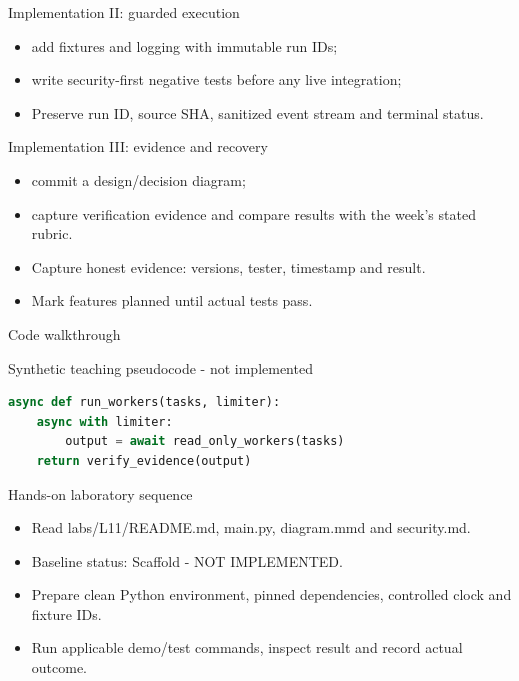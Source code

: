 \documentclass[aspectratio=169,10pt]{beamer}
\begin{document}
\begin{frame}{Implementation II: guarded execution}
\small
\begin{itemize}
\item add fixtures and logging with immutable run IDs;
\item write security-first negative tests before any live integration;
\item Preserve run ID, source SHA, sanitized event stream and terminal status.
\end{itemize}

\end{frame}

\begin{frame}{Implementation III: evidence and recovery}
\small
\begin{itemize}
\item commit a design/decision diagram;
\item capture verification evidence and compare results with the week's stated rubric.
\item Capture honest evidence: versions, tester, timestamp and result.
\item Mark features planned until actual tests pass.
\end{itemize}

\end{frame}

\begin{frame}[fragile]{Code walkthrough}
\small
\begin{block}{Synthetic teaching pseudocode - not implemented}\end{block}
\begin{lstlisting}[language=Python]
async def run_workers(tasks, limiter):
    async with limiter:
        output = await read_only_workers(tasks)
    return verify_evidence(output)
\end{lstlisting}

\end{frame}

\begin{frame}{Hands-on laboratory sequence}
\small
\begin{itemize}
\item Read labs/L11/README.md, main.py, diagram.mmd and security.md.
\item Baseline status: Scaffold - NOT IMPLEMENTED.
\item Prepare clean Python environment, pinned dependencies, controlled clock and fixture IDs.
\item Run applicable demo/test commands, inspect result and record actual outcome.
\end{itemize}

\end{frame}
\end{document}
